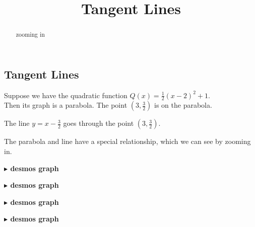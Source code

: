 \documentclass{ximera}
\title{Tangent Lines}
\begin{document}
\begin{abstract}
zooming in
\end{abstract}
\maketitle


 
 


\subsection*{Tangent Lines}



Suppose we have the quadratic function $Q(x) = \frac{1}{2} (x - 2)^2 + 1$. \\


Then its graph is a parabola. The point $\left( 3, \frac{3}{2} \right)$ is on the parabola.


The line $y=x-\frac{3}{2}$  goes through the point $\left( 3, \frac{3}{2} \right)$.

The parabola and line have a special relationship, which we can see by zooming in.






\textbf{\textcolor{blue!55!black}{$\blacktriangleright$ desmos graph}} 
\begin{center}
\end{center}





\textbf{\textcolor{blue!55!black}{$\blacktriangleright$ desmos graph}} 
\begin{center}
\end{center}





\textbf{\textcolor{blue!55!black}{$\blacktriangleright$ desmos graph}} 
\begin{center}
\end{center}






\textbf{\textcolor{blue!55!black}{$\blacktriangleright$ desmos graph}} 
\begin{center}
\end{center}
\end{document}
